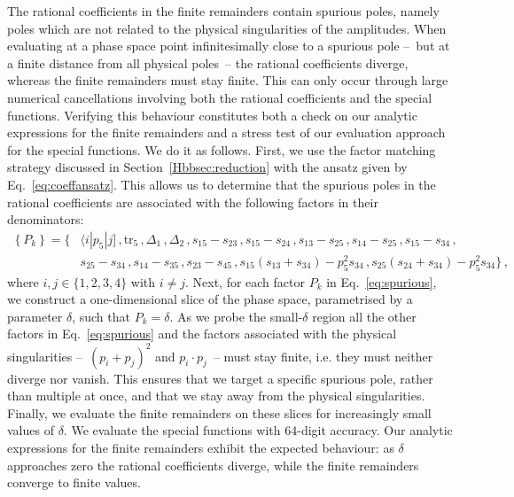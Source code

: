 \documentclass[main.tex]{subfiles}
\begin{document}
The rational coefficients in the finite remainders contain spurious poles, namely poles which are not related to the physical singularities of the amplitudes. When evaluating at a phase space point infinitesimally close to a spurious pole --~but at a finite distance from all physical poles~-- the rational coefficients diverge, whereas the finite remainders must stay finite. This can only occur through large numerical cancellations involving both the rational coefficients and the special functions. Verifying this behaviour constitutes both a check on our analytic expressions for the finite remainders and a stress test of our evaluation approach for the special functions. We do it as follows.
First, we use the factor matching strategy discussed in Section~\ref{Hbbsec:reduction} with the ansatz given by Eq.~\ref{eq:coeffansatz}. This allows us to determine that the spurious poles in the rational coefficients are associated with the following factors in their denominators:
\begin{equation} \label{eq:spurious}
\begin{aligned}
\left\{P_k \right\} = \biggl\{ & \langle i | p_{5}| j] \,, \text{tr}_5 \,, \Delta_1 \,, \Delta_2 \,, s_{15} - s_{23} \,, s_{15} - s_{24} \,, s_{13} - s_{25} \,, s_{14} - s_{25} \,, s_{15} - s_{34} \,,  \\
  &  s_{25} - s_{34} \,, s_{14} - s_{35} \,, s_{23} - s_{45} \,,
 s_{15} (s_{13}+s_{34}) - p_5^2  s_{34}  \,,
 s_{25} (s_{24}+s_{34}) - p_5^2  s_{34} \biggr\} \,,
\end{aligned}
\end{equation}
where $i,j \in \{1,2,3,4\}$ with $i\neq j$. Next, for each factor $P_k$ in Eq.~\ref{eq:spurious}, we construct a one-dimensional slice of the phase space, parametrised by a parameter $\delta$, such that $P_k = \delta$. As we probe the small-$\delta$ region all the other factors in Eq.~\ref{eq:spurious} and the factors associated with the physical singularities --~$(p_i+p_j)^2$ and $p_i \cdot p_j$~-- must stay finite, i.e. they must neither diverge nor vanish. This ensures that we target a specific spurious pole, rather than multiple at once, and that we stay away from the physical singularities. Finally, we evaluate the finite remainders on these slices for increasingly small values of $\delta$. We evaluate the special functions with $64$-digit accuracy. Our analytic expressions for the finite remainders exhibit the expected behaviour: as $\delta$ approaches zero the rational coefficients diverge, while the finite remainders converge to finite values. 
\end{document}
